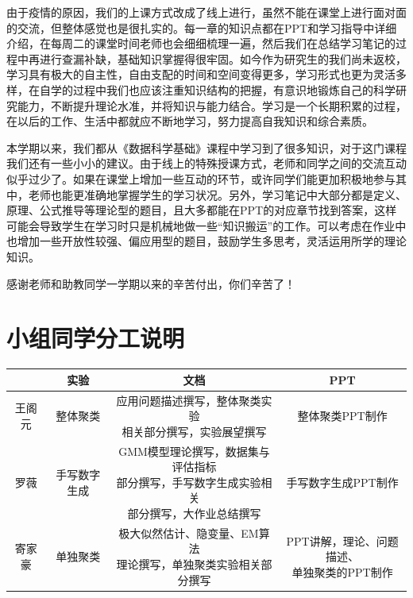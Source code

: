 \documentclass[UTF8]{ctexart}
\begin{document}
由于疫情的原因，我们的上课方式改成了线上进行，虽然不能在课堂上进行面对面的交流，但整体感觉也是很扎实的。每一章的知识点都在PPT和学习指导中详细介绍，在每周二的课堂时间老师也会细细梳理一遍，然后我们在总结学习笔记的过程中再进行查漏补缺，基础知识掌握得很牢固。如今作为研究生的我们尚未返校，学习具有极大的自主性，自由支配的时间和空间变得更多，学习形式也更为灵活多样，在自学的过程中我们也应该注重知识结构的把握，有意识地锻炼自己的科学研究能力，不断提升理论水准，并将知识与能力结合。学习是一个长期积累的过程，在以后的工作、生活中都就应不断地学习，努力提高自我知识和综合素质。

本学期以来，我们都从《数据科学基础》课程中学习到了很多知识，对于这门课程我们还有一些小小的建议。由于线上的特殊授课方式，老师和同学之间的交流互动似乎过少了。如果在课堂上增加一些互动的环节，或许同学们能更加积极地参与其中，老师也能更准确地掌握学生的学习状况。另外，学习笔记中大部分都是定义、原理、公式推导等理论型的题目，且大多都能在PPT的对应章节找到答案，这样可能会导致学生在学习时只是机械地做一些“知识搬运”的工作。可以考虑在作业中也增加一些开放性较强、偏应用型的题目，鼓励学生多思考，灵活运用所学的理论知识。

感谢老师和助教同学一学期以来的辛苦付出，你们辛苦了！

\section{小组同学分工说明}

\begin{table}[H]
\centering
\begin{tabular}{|c|c|c|c|}
\hline
    & 实验       & 文档                                            & PPT                      \\
\hline
王阁元 & 整体聚类   & \makecell[c]{应用问题描述撰写，整体聚类实验\\相关部分撰写，实验展望撰写}                  & 整体聚类PPT制作                \\
\hline
罗薇  & 手写数字生成 & \makecell[c]{GMM模型理论撰写，数据集与评估指标\\部分撰写，手写数字生成实验相关\\部分撰写，大作业总结撰写} & 手写数字生成PPT制作              \\
\hline
寄家豪 & 单独聚类   & \makecell[c]{极大似然估计、隐变量、EM算法\\理论撰写，单独聚类实验相关部分撰写}              & \makecell[c]{PPT讲解，理论、问题描述、\\单独聚类的PPT制作} \\
\hline
\end{tabular}
\end{table}
\end{document}
